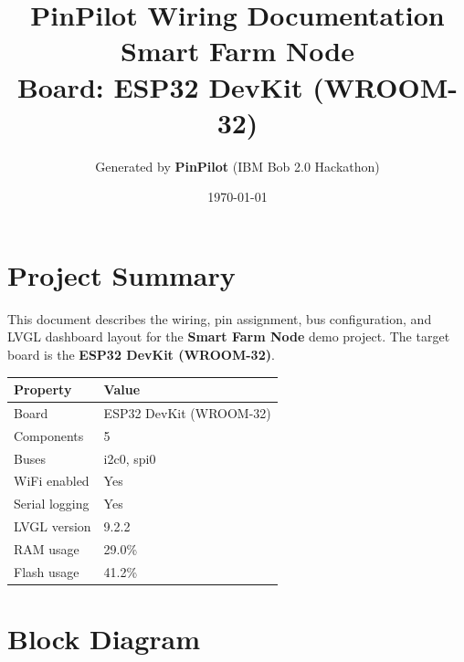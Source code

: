 \documentclass[a4paper,11pt]{article}
\title{\textbf{\color{pinpilotblue}PinPilot Wiring Documentation}\\[0.5em]\large Smart Farm Node\\[0.3em]\normalsize Board: ESP32 DevKit (WROOM-32)}
\author{Generated by \textbf{PinPilot} (IBM Bob 2.0 Hackathon)}
\date{\today}
\begin{document}
\maketitle
\tableofcontents
\newpage

\section{Project Summary}

This document describes the wiring, pin assignment, bus configuration, and LVGL dashboard layout for the \textbf{Smart Farm Node} demo project. The target board is the \textbf{ESP32 DevKit (WROOM-32)}.

\begin{center}
\begin{tabular}{ll}
\toprule
\textbf{Property} & \textbf{Value} \\
\midrule
Board & ESP32 DevKit (WROOM-32) \\
Components & 5 \\
Buses & i2c0, spi0 \\
WiFi enabled & Yes \\
Serial logging & Yes \\
LVGL version & 9.2.2 \\
RAM usage & 29.0\% \\
Flash usage & 41.2\% \\
\bottomrule
\end{tabular}
\end{center}

\section{Block Diagram}
\end{document}
